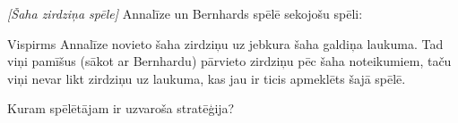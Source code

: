 






\noindent 

\begin{problem}
\textit{[Šaha zirdziņa spēle]}
Annalīze un Bernhards spēlē sekojošu spēli:

Vispirms Annalīze novieto šaha zirdziņu uz jebkura šaha galdiņa laukuma. Tad viņi pamīšus (sākot ar Bernhardu) pārvieto zirdziņu pēc šaha noteikumiem, taču viņi nevar likt zirdziņu uz laukuma, kas jau ir ticis apmeklēts šajā spēlē.

Kuram spēlētājam ir uzvaroša stratēģija?

\end{problem}
%




